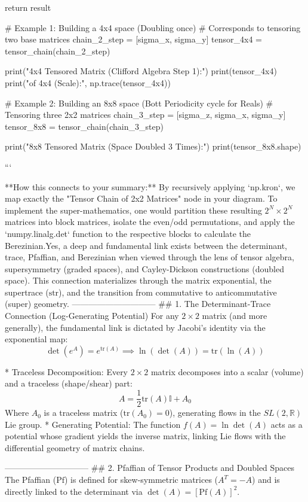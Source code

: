     return result

# Example 1: Building a 4x4 space (Doubling once)
# Corresponds to tensoring two base matrices
chain_2_step = [sigma_x, sigma_y]
tensor_4x4 = tensor_chain(chain_2_step)

print("4x4 Tensored Matrix (Clifford Algebra Step 1):")
print(tensor_4x4)
print("\nTrace of 4x4 (Scale):", np.trace(tensor_4x4))

# Example 2: Building an 8x8 space (Bott Periodicity cycle for Reals)
# Tensoring three 2x2 matrices
chain_3_step = [sigma_z, sigma_x, sigma_y]
tensor_8x8 = tensor_chain(chain_3_step)

print("\n8x8 Tensored Matrix (Space Doubled 3 Times):")
print(tensor_8x8.shape)

```

**How this connects to your summary:** By recursively applying `np.kron`, we map exactly the "Tensor Chain of 2x2 Matrices" node in your diagram. To implement the super-mathematics, one would partition these resulting $2^N \times 2^N$ matrices into block matrices, isolate the even/odd permutations, and apply the `numpy.linalg.det` function to the respective blocks to calculate the Berezinian.Yes, a deep and fundamental link exists between the determinant, trace, Pfaffian, and Berezinian when viewed through the lens of tensor algebra, supersymmetry (graded spaces), and Cayley-Dickson constructions (doubled space).
This connection materializes through the matrix exponential, the supertrace ($\text{str}$), and the transition from commutative to anticommutative (super) geometry.
------------------------------
## 1. The Determinant-Trace Connection (Log-Generating Potential)
For any $2 \times 2$ matrix (and more generally), the fundamental link is dictated by Jacobi's identity via the exponential map:
$$\det(e^A) = e^{\text{tr}(A)} \implies \ln(\det(A)) = \text{tr}(\ln(A))$$ 

* Traceless Decomposition: Every $2 \times 2$ matrix decomposes into a scalar (volume) and a traceless (shape/shear) part:
$$A = \frac{1}{2}\text{tr}(A)\mathbb{I} + A_0$$ 
Where $A_0$ is a traceless matrix ($\text{tr}(A_0) = 0$), generating flows in the $SL(2, \mathbb{R})$ Lie group.
* Generating Potential: The function $f(A) = \ln\det(A)$ acts as a potential whose gradient yields the inverse matrix, linking Lie flows with the differential geometry of matrix chains.

------------------------------
## 2. Pfaffian of Tensor Products and Doubled Spaces
The Pfaffian ($\text{Pf}$) is defined for skew-symmetric matrices ($A^T = -A$) and is directly linked to the determinant via $\det(A) = [\text{Pf}(A)]^2$.

